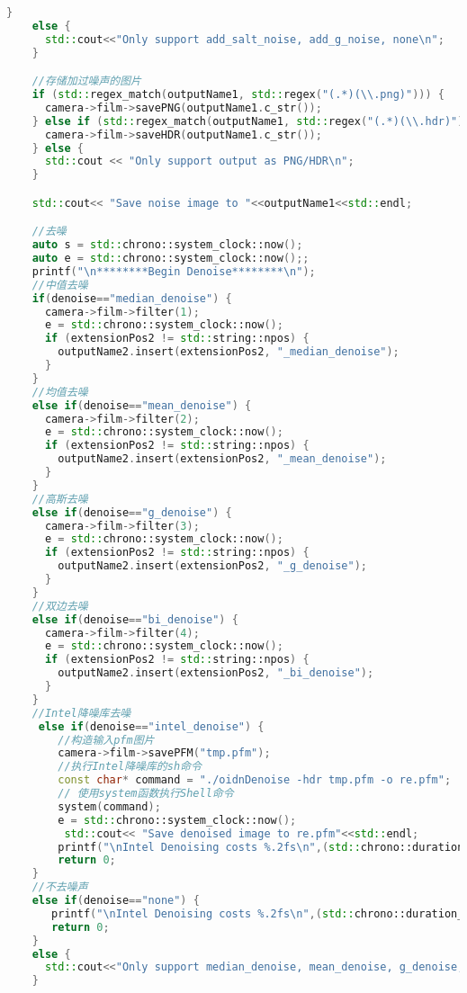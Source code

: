 \documentclass[lang=cn,10pt]{elegantbook}
\begin{document}
\begin{itemize}
\begin{lstlisting}[language=c++]
    }
    else {
      std::cout<<"Only support add_salt_noise, add_g_noise, none\n";
    }

    //存储加过噪声的图片
    if (std::regex_match(outputName1, std::regex("(.*)(\\.png)"))) {
      camera->film->savePNG(outputName1.c_str());
    } else if (std::regex_match(outputName1, std::regex("(.*)(\\.hdr)"))) {
      camera->film->saveHDR(outputName1.c_str());
    } else {
      std::cout << "Only support output as PNG/HDR\n";
    }

    std::cout<< "Save noise image to "<<outputName1<<std::endl;

    //去噪
    auto s = std::chrono::system_clock::now();
    auto e = std::chrono::system_clock::now();;
    printf("\n********Begin Denoise********\n");
    //中值去噪
    if(denoise=="median_denoise") {
      camera->film->filter(1);
      e = std::chrono::system_clock::now();
      if (extensionPos2 != std::string::npos) {
        outputName2.insert(extensionPos2, "_median_denoise");
      }
    }
    //均值去噪
    else if(denoise=="mean_denoise") {
      camera->film->filter(2);
      e = std::chrono::system_clock::now();
      if (extensionPos2 != std::string::npos) {
        outputName2.insert(extensionPos2, "_mean_denoise");
      }
    }
    //高斯去噪
    else if(denoise=="g_denoise") {
      camera->film->filter(3);
      e = std::chrono::system_clock::now();
      if (extensionPos2 != std::string::npos) {
        outputName2.insert(extensionPos2, "_g_denoise");
      }
    }
    //双边去噪
    else if(denoise=="bi_denoise") {
      camera->film->filter(4);
      e = std::chrono::system_clock::now();
      if (extensionPos2 != std::string::npos) {
        outputName2.insert(extensionPos2, "_bi_denoise");
      }
    }
    //Intel降噪库去噪
     else if(denoise=="intel_denoise") {
        //构造输入pfm图片
        camera->film->savePFM("tmp.pfm");
        //执行Intel降噪库的sh命令
        const char* command = "./oidnDenoise -hdr tmp.pfm -o re.pfm"; 
        // 使用system函数执行Shell命令
        system(command); 
        e = std::chrono::system_clock::now();
         std::cout<< "Save denoised image to re.pfm"<<std::endl;
        printf("\nIntel Denoising costs %.2fs\n",(std::chrono::duration_cast<std::chrono::milliseconds>(e - s)) .count() / 1000.f);
        return 0; 
    }
    //不去噪声
    else if(denoise=="none") {
       printf("\nIntel Denoising costs %.2fs\n",(std::chrono::duration_cast<std::chrono::milliseconds>(e - s)) .count() / 1000.f);
       return 0;
    }
    else {
      std::cout<<"Only support median_denoise, mean_denoise, g_denoise, bi_denoise, intel_denoise, none\n";
    }


\end{lstlisting}
\end{itemize}
\end{document}
